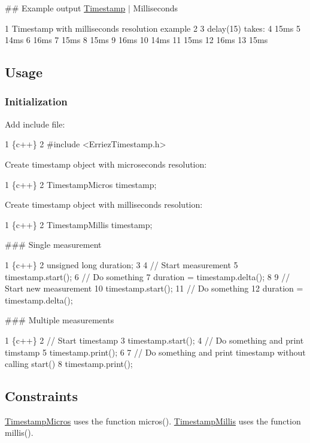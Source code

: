 \#\# Example output \hyperlink{class_timestamp}{Timestamp} $\vert$ Milliseconds 
\begin{DoxyCode}
1 Timestamp with milliseconds resolution example
2 
3 delay(15) takes:
4 15ms
5 14ms
6 16ms
7 15ms
8 15ms
9 16ms
10 14ms
11 15ms
12 16ms
13 15ms
\end{DoxyCode}


\subsection*{Usage}

\subsubsection*{Initialization}

Add include file\+: 
\begin{DoxyCode}
1 \{c++\}
2 #include <ErriezTimestamp.h>
\end{DoxyCode}


Create timestamp object with microseconds resolution\+: 
\begin{DoxyCode}
1 \{c++\}
2 TimestampMicros timestamp;
\end{DoxyCode}


Create timestamp object with milliseconds resolution\+: 
\begin{DoxyCode}
1 \{c++\}
2 TimestampMillis timestamp;
\end{DoxyCode}


\#\#\# Single measurement 
\begin{DoxyCode}
1 \{c++\}
2 unsigned long duration;
3 
4 // Start measurement
5 timestamp.start();
6 // Do something
7 duration = timestamp.delta();
8 
9 // Start new measurement
10 timestamp.start();
11 // Do something
12 duration = timestamp.delta();
\end{DoxyCode}


\#\#\# Multiple measurements 
\begin{DoxyCode}
1 \{c++\}
2 // Start timestamp
3 timestamp.start();
4 // Do something and print timstamp
5 timestamp.print();
6 
7 // Do something and print timestamp without calling start()
8 timestamp.print();
\end{DoxyCode}


\subsection*{Constraints}

\hyperlink{class_timestamp_micros}{Timestamp\+Micros} uses the function micros(). \hyperlink{class_timestamp_millis}{Timestamp\+Millis} uses the function millis().

